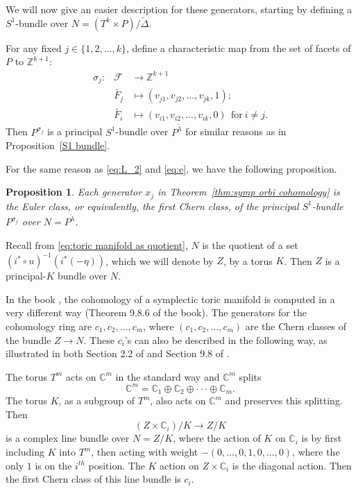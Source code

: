 \documentclass[12pt]{amsart}
\newtheorem{proposition}[theorem]{Proposition}
\theoremstyle{definition}
\numberwithin{equation}{section}
\begin{document}
 We will now give an easier description for these generators,
starting by defining a $S^1$-bundle over $N=(T^k\times
P)/\tilde{\Delta}$.

For any fixed $j\in\{1,2,...,k\}$, define a characteristic map from
the set of facets of $P$ to ${{\mathbb{Z}}}^{k+1}$:
\begin{eqnarray*}
\sigma_{j}: & {{\mathcal{F}}} &\rightarrow {{\mathbb{Z}}}^{k+1}\\
        & \tilde{F_{j}}&\mapsto (v_{j1},v_{j2},...,v_{jk},1);\\
        & \tilde{F_{i}}&\mapsto (v_{i1},v_{i2},...,v_{ik},0)\ \
        \mbox{for}\  i\neq j.
\end{eqnarray*}
Then $P^{\sigma_{j}}$ is a principal $S^1$-bundle over
$P^{\tilde{\lambda}}$ for similar reasons as in Proposition~\ref{S1
bundle}.

For the same reason as \eqref{eq:L_2} and \eqref{eq:e}, we have the
following proposition.

\begin{proposition} \label{prop:x_i is chern class of a artificial
bundle} Each generator $x_{j}$ in Theorem~\ref{thm:symp orbi
cohomology} is the Euler class, or equivalently, the first Chern
class, of the principal $S^1$-bundle $P^{\sigma_{j}}$ over
$N=P^{\tilde{\lambda}}$.
\end{proposition}

Recall from \eqref{eq:toric manifold as quotient}, $N$ is the
quotient of a set $(i^*\circ u)^{-1}(i^{*}(-\eta))$, which we will
denote by $Z$, by a torus $K$. Then $Z$ is a principal-$K$ bundle
over $N$.

In the book \cite{book:equivariant deRham}, the cohomology of a
symplectic toric manifold is computed in a very different way
(Theorem 9.8.6 of the book). The generators for the cohomology ring
are $c_{1},c_{2},...,c_{m}$, where $(c_{1},c_{2},...,c_{m})$ are the
Chern classes of the bundle $Z\rightarrow N$. These $c_{i}$'s can
also be described in the following way, as illustrated in both
Section 2.2 of \cite{Guillemin:book} and Section 9.8 of
\cite{book:equivariant deRham}.

The torus $T^m$ acts on ${{\mathbb{C}}}^m$ in the standard way and ${{\mathbb{C}}}^{m}$
splits
\begin{equation}
{{\mathbb{C}}}^m = {{\mathbb{C}}}_{1}\oplus {{\mathbb{C}}}_{2}\oplus{{\cdot\cdot\cdot}} \oplus {{\mathbb{C}}}_{m}.
\end{equation}
The torus $K$, as a subgroup of $T^m$, also acts on ${{\mathbb{C}}}^m$ and
preserves this splitting. Then
\begin{equation}
(Z\times {{\mathbb{C}}}_{i})/K\rightarrow Z/K
\end{equation}
is a complex line bundle over $N=Z/K$, where the action of $K$ on
${{\mathbb{C}}}_{i}$ is by first including $K$ into $T^m$, then acting with
weight $-(0,...,0,1,0,...,0)$, where the only $1$ is on the $i^{th}$
position. The $K$ action on $Z\times {{\mathbb{C}}}_{i}$ is the diagonal action.
Then the first Chern class of this line bundle is $c_{i}$.
\end{document}
